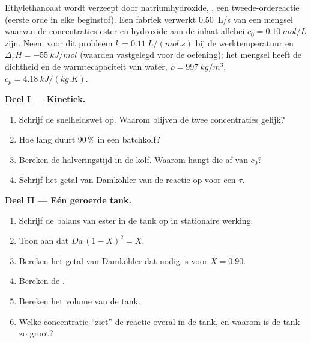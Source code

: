 \begin{problem}
\label{pb:b2:continuous-reactors:1}
Ethylethanoaat wordt verzeept door natriumhydroxide,
, een tweede-ordereactie (eerste
orde in elke beginstof). Een fabriek verwerkt \qty{0.50}{L/s} van een mengsel waarvan de
concentraties ester en hydroxide aan de inlaat allebei $c_0 =
\qty{0.10}{mol/L}$ zijn. Neem voor dit probleem $k = \qty{0.11}{L/(mol.s)}$ bij de
werktemperatuur en $\Delta_r H = \qty{-55}{kJ/mol}$ (waarden vastgelegd voor de
oefening); het mengsel heeft de dichtheid en de warmtecapaciteit van water,
$\rho = \qty{997}{kg/m^3}$, $c_p = \qty{4.18}{kJ/(kg.K)}$.

\medskip
\noindent\textbf{Deel I --- Kinetiek.}
\begin{enumerate}
  \item Schrijf de snelheidswet op. Waarom blijven de twee concentraties gelijk?
  \item Hoe lang duurt 90\,\%  in een batchkolf?
  \item Bereken de halveringstijd in de kolf. Waarom hangt die af van $c_0$?
  \item Schrijf het getal van Damköhler van de reactie op voor een  $\tau$.
\end{enumerate}

\medskip
\noindent\textbf{Deel II --- Eén geroerde tank.}
\begin{enumerate}[resume]
  \item Schrijf de balans van ester in de tank op in stationaire werking.
  \item Toon aan dat $Da\,(1 - X)^2 = X$.
  \item Bereken het getal van Damköhler dat nodig is voor $X = 0.90$.
  \item Bereken de .
  \item Bereken het volume van de tank.
  \item Welke concentratie ``ziet'' de reactie overal in de tank,
        en waarom is de tank zo groot?
\end{enumerate}


\end{problem}
